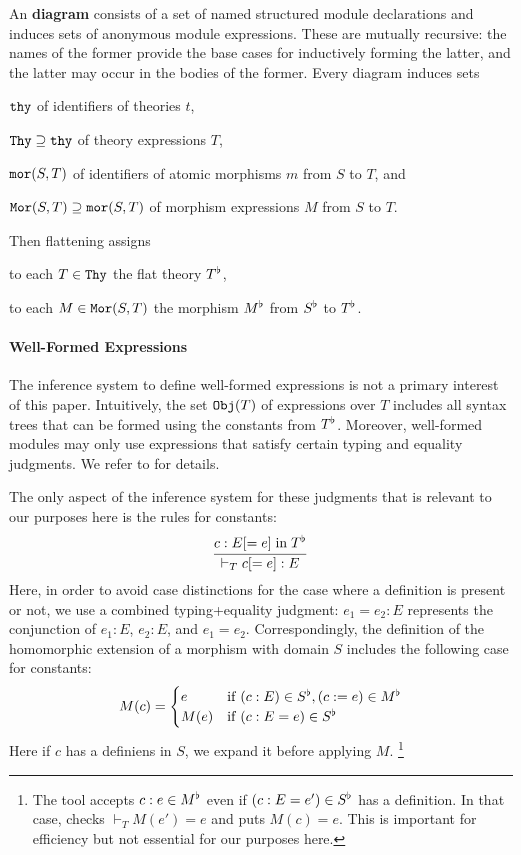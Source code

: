 An \mmt \textbf{diagram} consists of a set of named structured module declarations and induces sets of anonymous module expressions.
These are mutually recursive: the names of the former provide the base cases for inductively forming the latter, and the latter may occur in the bodies of the former.
Every diagram induces sets
\begin{compactitem}
 \item $\mathtt{thy}$ of identifiers of theories $t$,
 \item $\mathtt{Thy}\supseteq \mathtt{thy}$ of theory expressions $T$,
 \item $\mathtt{mor}(S,T)$ of identifiers of atomic morphisms $m$ from $S$ to $T$, and
 \item $\mathtt{Mor}(S,T)\supseteq\mathtt{mor}(S,T)$ of morphism expressions $M$ from $S$ to $T$.
\end{compactitem}
Then flattening assigns
\begin{compactitem}
 \item to each $T\in\mathtt{Thy}$ the flat theory $T^\flat$,
 \item to each $M\in\mathtt{Mor}(S,T)$ the morphism $M^\flat$ from $S^\flat$ to $T^\flat$.
\end{compactitem}

\paragraph{Well-Formed Expressions}
The inference system to define well-formed expressions is not a primary interest of this paper.
Intuitively, the set $\mathtt{Obj}(T)$ of expressions over $T$ includes all syntax trees that can be formed using the constants from $T^\flat$.
Moreover, well-formed modules may only use expressions that satisfy certain typing and equality judgments.
We refer to \cite{rabe:howto:14} for details.

The only aspect of the inference system for these judgments that is relevant to our purposes here is the rules for constants:
\[\cfrac{c:E[=e] \;\mathrm{in}\; T^\flat}{\vdash_T c[=e]:E}\,\]
Here, in order to avoid case distinctions for the case where a definition is present or not, we use a combined typing+equality judgment: $e_1=e_2:E$ represents the conjunction of $e_1:E$, $e_2:E$, and $e_1=e_2$.
Correspondingly, the definition of the homomorphic extension of a morphism with domain $S$ includes the following case for constants:
\[M(c) = \begin{cases}e&\mathrm{if}\; (c:E) \in S^\flat, (c:=e)\in M^\flat \\ M(e) &\mathrm{if}\; (c:E=e)\in S^\flat\end{cases}\]
Here if $c$ has a definiens in $S$, we expand it before applying $M$.%
\footnote{The \mmt tool accepts $c:e\in M^\flat$ even if $(c:E=e')\in S^\flat$ has a definition. In that case, \mmt checks $\vdash_T M(e')=e$ and puts $M(c)=e$. This is important for efficiency but not essential for our purposes here.}

